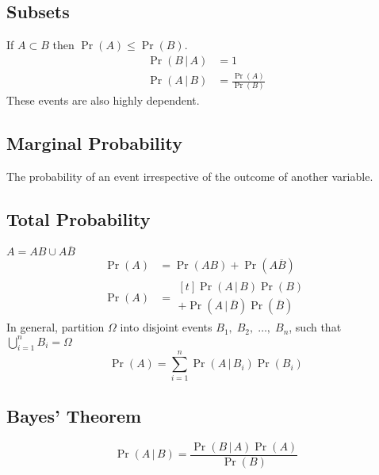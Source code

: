 \documentclass{article}
\begin{document}
\begin{multicols}{3}
    \subsection{Subsets}
    If \(A \subset B\) then \(\Pr{\left( A \right)} \leq \Pr{\left( B \right)}\).
    \begin{align*}
        \Pr{\left( B \,\vert\, A \right)} & = 1                                                   \\
        \Pr{\left( A \,\vert\, B \right)} & = \frac{\Pr{\left( A \right)}}{\Pr{\left( B \right)}}
    \end{align*}
    These events are also highly dependent.
    \subsection{Marginal Probability}
    The probability of an event irrespective of the outcome of another variable.
    \subsection{Total Probability}
    \(A = AB \cup A\overline{B}\)
    \begin{align*}
        \Pr{\left( A \right)} & = \Pr{\left( AB \right)} + \Pr{\left( A\overline{B} \right)} \\
        \Pr{\left( A \right)} & = \begin{aligned}[t]
                                      \Pr{\left( A \,\vert\, B \right)}\Pr{\left( B \right)} \\
                                      + \Pr{\left( A \,\vert\, \overline{B} \right)}\Pr{\left( \overline{B} \right)}
                                  \end{aligned}
    \end{align*}
    In general, partition \(\Omega\) into disjoint events \(B_1,\; B_2,\; \dots,\; B_n\),
    such that \(\bigcup_{i=1}^n B_i = \Omega\)
    \begin{equation*}
        \Pr{\left( A \right)} = \sum_{i = 1}^n \Pr{\left( A \,\vert\, B_i \right)}\Pr{\left( B_i \right)}
    \end{equation*}
    \subsection{Bayes' Theorem}
    \begin{equation*}
        \Pr{\left( A \,\vert\, B \right)} = \frac{\Pr{\left( B \,\vert\, A \right)}\Pr{\left( A \right)}}{\Pr{\left( B \right)}}
    \end{equation*}

\end{multicols}
\end{document}
